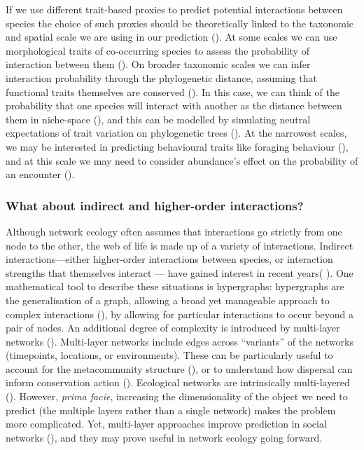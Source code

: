 \begin{refsection}
If we use different trait-based proxies to predict potential
interactions between species the choice of such proxies should be
theoretically linked to the taxonomic and spatial scale we are using in
our prediction (\cite{Wiens1989SpaSca}). At some scales we can use
morphological traits of co-occurring species to assess the probability
of interaction between them (\cite{Bartomeus2016ComFra}). On broader
taxonomic scales we can infer interaction probability through the
phylogenetic distance, assuming that functional traits themselves are
conserved (\cite{Gomez2010EcoInt}). In this case, we can think of the
probability that one species will interact with another as the distance
between them in niche-space (\cite{Desjardins-Proulx2017EcoInt}), and this
can be modelled by simulating neutral expectations of trait variation on
phylogenetic trees (\cite{Davies2021EcoRed}). At the narrowest scales, we
may be interested in predicting behavioural traits like foraging
behaviour (\cite{Bartomeus2016ComFra}), and at this scale we may need to
consider abundance's effect on the probability of an encounter
(\cite{Wells2013SpeInt}).

\subsubsection{What about indirect and higher-order
interactions?}\label{what-about-indirect-and-higher-order-interactions}

Although network ecology often assumes that interactions go strictly
from one node to the other, the web of life is made up of a variety of
interactions. Indirect interactions---either higher-order interactions
between species, or interaction strengths that themselves interact ---
have gained interest in recent years( \cite{Golubski2016EcoNet,
Golubski2011ModMod}). One mathematical tool to describe these
situations is hypergraphs: hypergraphs are the generalisation of a
graph, allowing a broad yet manageable approach to complex interactions
(\cite{Carletti2020DynSys}), by allowing for particular interactions to
occur beyond a pair of nodes. An additional degree of complexity is
introduced by multi-layer networks (\cite{Hutchinson2019SeeFor}).
Multi-layer networks include edges across ``variants'' of the networks
(timepoints, locations, or environments). These can be particularly
useful to account for the metacommunity structure
(\cite{Gross2020ModMod}), or to understand how dispersal can inform
conservation action (\cite{Albert2017AppNet}). Ecological networks are
intrinsically multi-layered (\cite{Pilosof2017MulNat}). However,
\emph{prima facie}, increasing the dimensionality of the object we need
to predict (the multiple layers rather than a single network) makes the
problem more complicated. Yet, multi-layer approaches improve prediction
in social networks (\cite{Jalili2017LinPre, Najari2019LinPre,
Yasami2018NovMul}), and they may prove useful in network ecology going
forward.


\end{refsection}
